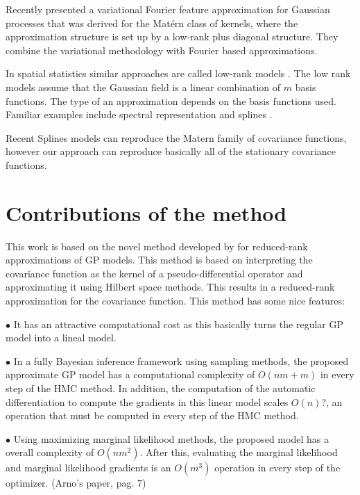 \documentclass[]{interact}
\theoremstyle{plain}%
\theoremstyle{definition}
\theoremstyle{remark}
\begin{document}
Recently \citep{hensman2017variational} presented a variational Fourier feature approximation for Gaussian processes that was derived for the Mat{\'e}rn class of kernels, where the approximation structure is set up by a low-rank plus diagonal structure. They combine the variational methodology with Fourier based approximations.

In spatial statistics similar approaches are called low-rank models \citep{diggle2007springer}. The low rank models assume that the Gaussian field is a linear combination of $m$ basis functions. The type of an approximation depends on the basis functions used. Familiar examples include spectral representation \citep{diggle2007springer,paciorek2007computational,paciorek2007bayesian} and splines \citep{wood2003thin}. 

Recent Splines models can reproduce the Matern family of covariance functions, however our approach can reproduce basically all of the stationary covariance functions.


\section{Contributions of the method}

This work is based on the novel method developed by \cite{solin2018hilbert} for reduced-rank approximations of GP models. This method is based on interpreting the covariance function as the kernel of a pseudo-differential operator and approximating it using Hilbert space methods. This results in a reduced-rank approximation for the covariance function. This method has some nice features:

\vspace{2mm}
$\bullet$ It has an attractive computational cost as this basically turns the regular GP model into a lineal model.

\vspace{2mm}
$\bullet$ In a fully Bayesian inference framework using sampling methods, the proposed approximate GP model has a computational complexity of $O(nm+m)$ in every step of the HMC method. In addition, the computation of the automatic differentiation to compute the gradients in this linear model scales $O(n)$?, an operation that must be computed in every step of the HMC method.

\vspace{2mm}
$\bullet$ Using maximizing marginal likelihood methods, the proposed model has a overall complexity of $O(nm^2)$. After this, evaluating the marginal likelihood and marginal likelihood gradients is an $O(m^3)$ operation in every step of the optimizer. (Arno's paper, pag. 7)
\end{document}

